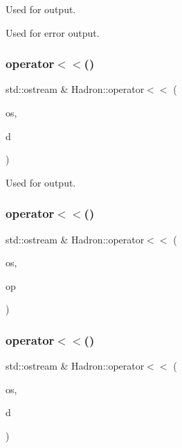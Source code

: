 Used for output. 

Used for error output. \mbox{\label{namespaceHadron_ae2a5c7a5ffdda238337fd194679743a6}} 
\subsubsection{\texorpdfstring{operator$<$$<$()}{operator<<()}\hspace{0.1cm}{\footnotesize\ttfamily [2/48]}}
{\footnotesize\ttfamily std\+::ostream \& Hadron\+::operator$<$$<$ (\begin{DoxyParamCaption}\item[{std\+::ostream \&}]{os,  }\item[{const \mbox{\hyperlink{structHadron_1_1HadronNptType__t}{Hadron\+Npt\+Type\+\_\+t}} \&}]{d }\end{DoxyParamCaption})}



Used for output. 

\mbox{\label{namespaceHadron_a7351a4ec8398497cfa72ae6326e7d88c}} 
\subsubsection{\texorpdfstring{operator$<$$<$()}{operator<<()}\hspace{0.1cm}{\footnotesize\ttfamily [3/48]}}
{\footnotesize\ttfamily std\+::ostream \& Hadron\+::operator$<$$<$ (\begin{DoxyParamCaption}\item[{std\+::ostream \&}]{os,  }\item[{const \mbox{\hyperlink{structHadron_1_1KeyCGCSU3__t}{Key\+C\+G\+C\+S\+U3\+\_\+t}} \&}]{op }\end{DoxyParamCaption})}

\mbox{\label{namespaceHadron_a8b41635ad70840ac7fc9ebff331876e4}} 
\subsubsection{\texorpdfstring{operator$<$$<$()}{operator<<()}\hspace{0.1cm}{\footnotesize\ttfamily [4/48]}}
{\footnotesize\ttfamily std\+::ostream \& Hadron\+::operator$<$$<$ (\begin{DoxyParamCaption}\item[{std\+::ostream \&}]{os,  }\item[{const \mbox{\hyperlink{structHadron_1_1KeyHadronNPartIrrep__t}{Key\+Hadron\+N\+Part\+Irrep\+\_\+t}} \&}]{d }\end{DoxyParamCaption})}



